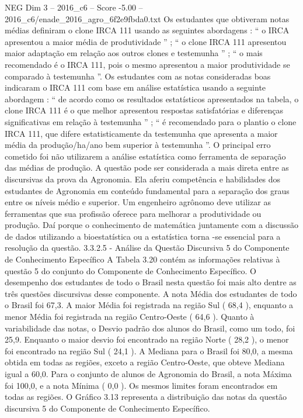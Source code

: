 \begin{textsample}{NEG Dim 3 – 2016\_c6 – Score -5.00 – 2016\_c6/enade\_2016\_agro\_6f2e9fbda0.txt}
Os estudantes que obtiveram notas médias definiram o clone IRCA 111 usando as seguintes abordagens : “ o IRCA apresentou a maior média de produtividade ” ; “ o clone IRCA 111 apresentou maior adaptação em relação aos outros clones e testemunha ” ; “ o mais recomendado é o IRCA 111, pois o mesmo apresentou a maior produtividade se comparado à testemunha ”.
Os estudantes com as notas consideradas boas indicaram o IRCA 111 com base em análise estatística usando a seguinte abordagem : “ de acordo como os resultados estatísticos apresentados na tabela, o clone IRCA 111 é o que melhor apresentou respostas satisfatórias e diferenças significativas em relação à testemunha ” ; “ é recomendado para o plantio o clone IRCA 111, que difere estatisticamente da testemunha que apresenta a maior média da produção/ha/ano bem superior à testemunha ”.
O principal erro cometido foi não utilizarem a análise estatística como ferramenta de separação das médias de produção.
A questão pode ser considerada a mais direta entre as discursivas da prova da Agronomia.
Ela aferiu competência e habilidades dos estudantes de Agronomia em conteúdo fundamental para a separação dos graus entre os níveis médio e superior.
Um engenheiro agrônomo deve utilizar as ferramentas que sua profissão oferece para melhorar a produtividade ou produção.
Daí porque o conhecimento de matemática juntamente com a discussão de dados utilizando a bioestatística ou a estatística torna -se essencial para a resolução da questão. 3.3.2.5 - Análise da Questão Discursiva 5 do Componente de Conhecimento Específico A Tabela 3.20 contém as informações relativas à questão 5 do conjunto do Componente de Conhecimento Específico.
O desempenho dos estudantes de todo o Brasil nesta questão foi mais alto dentre as três questões discursivas desse componente.
A nota Média dos estudantes de todo o Brasil foi 67,3.
A maior Média foi registrada na região Sul ( 68,4 ), enquanto a menor Média foi registrada na região Centro-Oeste ( 64,6 ).
Quanto à variabilidade das notas, o Desvio padrão dos alunos do Brasil, como um todo, foi 25,9.
Enquanto o maior desvio foi encontrado na região Norte ( 28,2 ), o menor foi encontrado na região Sul ( 24,1 ).
A Mediana para o Brasil foi 80,0, a mesma obtida em todas as regiões, exceto a região Centro-Oeste, que obteve Mediana igual a 60,0.
Para o conjunto de alunos de Agronomia do Brasil, a nota Máxima foi 100,0, e a nota Mínima ( 0,0 ).
Os mesmos limites foram encontrados em todas as regiões.
O Gráfico 3.13 representa a distribuição das notas da questão discursiva 5 do Componente de Conhecimento Específico.

\end{textsample}
